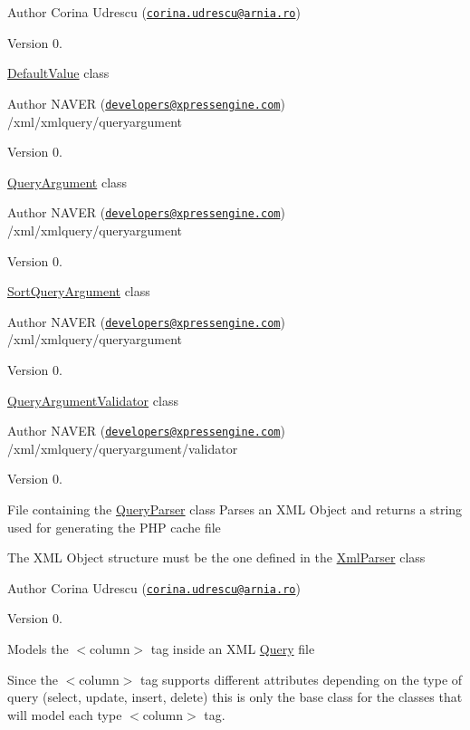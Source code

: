 \begin{DoxyAuthor}{Author}
Corina Udrescu (\href{mailto:corina.udrescu@arnia.ro}{\tt corina.\-udrescu@arnia.\-ro})  
\end{DoxyAuthor}
\begin{DoxyVersion}{Version}
0.
\end{DoxyVersion}
\hyperlink{classDefaultValue}{Default\-Value} class \begin{DoxyAuthor}{Author}
N\-A\-V\-E\-R (\href{mailto:developers@xpressengine.com}{\tt developers@xpressengine.\-com}) /xml/xmlquery/queryargument 
\end{DoxyAuthor}
\begin{DoxyVersion}{Version}
0.
\end{DoxyVersion}
\hyperlink{classQueryArgument}{Query\-Argument} class \begin{DoxyAuthor}{Author}
N\-A\-V\-E\-R (\href{mailto:developers@xpressengine.com}{\tt developers@xpressengine.\-com}) /xml/xmlquery/queryargument 
\end{DoxyAuthor}
\begin{DoxyVersion}{Version}
0.
\end{DoxyVersion}
\hyperlink{classSortQueryArgument}{Sort\-Query\-Argument} class \begin{DoxyAuthor}{Author}
N\-A\-V\-E\-R (\href{mailto:developers@xpressengine.com}{\tt developers@xpressengine.\-com}) /xml/xmlquery/queryargument 
\end{DoxyAuthor}
\begin{DoxyVersion}{Version}
0.
\end{DoxyVersion}
\hyperlink{classQueryArgumentValidator}{Query\-Argument\-Validator} class \begin{DoxyAuthor}{Author}
N\-A\-V\-E\-R (\href{mailto:developers@xpressengine.com}{\tt developers@xpressengine.\-com}) /xml/xmlquery/queryargument/validator 
\end{DoxyAuthor}
\begin{DoxyVersion}{Version}
0.
\end{DoxyVersion}
File containing the \hyperlink{classQueryParser}{Query\-Parser} class Parses an X\-M\-L Object and returns a string used for generating the P\-H\-P cache file \par
 The X\-M\-L Object structure must be the one defined in the \hyperlink{classXmlParser}{Xml\-Parser} class

\begin{DoxyAuthor}{Author}
Corina Udrescu (\href{mailto:corina.udrescu@arnia.ro}{\tt corina.\-udrescu@arnia.\-ro})  
\end{DoxyAuthor}
\begin{DoxyVersion}{Version}
0.
\end{DoxyVersion}
Models the $<$column$>$ tag inside an X\-M\-L \hyperlink{classQuery}{Query} file \par
 Since the $<$column$>$ tag supports different attributes depending on the type of query (select, update, insert, delete) this is only the base class for the classes that will model each type $<$column$>$ tag.

